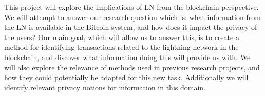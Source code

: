 This project will explore the implications of LN from the blockchain perspective.
We will attempt to answer our research question which is: what information from the LN is available in the Bitcoin system, and how does it impact the privacy of the users?
Our main goal, which will allow us to answer this, is to create a method for identifying transactions related to the lightning network in the blockchain, and discover what information doing this will provide us with.
We will also explore the relevance of methods used in previous research projects, and how they could potentially be adapted for this new task. Additionally we will identify relevant privacy notions for information in this domain.

